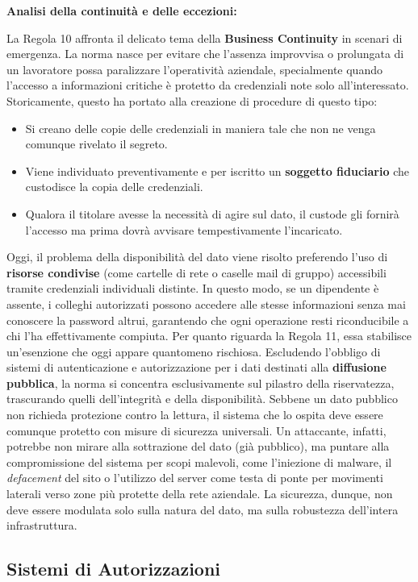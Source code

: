 \textbf{Analisi della continuità e delle eccezioni:}

La Regola 10 affronta il delicato tema della \textbf{Business Continuity} in scenari di emergenza.
La norma nasce per evitare che l'assenza improvvisa o prolungata di un lavoratore possa paralizzare l'operatività aziendale, specialmente quando l'accesso a informazioni critiche è protetto da credenziali note solo all'interessato.
Storicamente, questo ha portato alla creazione di procedure di questo tipo:
\begin{itemize}
    \item Si creano delle copie delle credenziali in maniera tale che non ne venga comunque rivelato il segreto.
    \item Viene individuato preventivamente e per iscritto un \textbf{soggetto fiduciario} che custodisce la copia delle credenziali.
    \item Qualora il titolare avesse la necessità di agire sul dato, il custode gli fornirà l'accesso ma prima dovrà avvisare tempestivamente l'incaricato.
\end{itemize}

Oggi, il problema della disponibilità del dato viene risolto preferendo l'uso di \textbf{risorse condivise} (come cartelle di rete o caselle mail di gruppo) accessibili tramite credenziali individuali distinte.
In questo modo, se un dipendente è assente, i colleghi autorizzati possono accedere alle stesse informazioni senza mai conoscere la password altrui, garantendo che ogni operazione resti riconducibile a chi l'ha effettivamente compiuta.
Per quanto riguarda la Regola 11, essa stabilisce un'esenzione che oggi appare quantomeno rischiosa.
Escludendo l'obbligo di sistemi di autenticazione e autorizzazione per i dati destinati alla \textbf{diffusione pubblica}, la norma si concentra esclusivamente sul pilastro della riservatezza, trascurando quelli dell'integrità e della disponibilità.
Sebbene un dato pubblico non richieda protezione contro la lettura, il sistema che lo ospita deve essere comunque protetto con misure di sicurezza universali.
Un attaccante, infatti, potrebbe non mirare alla sottrazione del dato (già pubblico), ma puntare alla compromissione del sistema per scopi malevoli, come l'iniezione di malware, il \textit{defacement} del sito o l'utilizzo del server come testa di ponte per movimenti laterali verso zone più protette della rete aziendale.
La sicurezza, dunque, non deve essere modulata solo sulla natura del dato, ma sulla robustezza dell'intera infrastruttura.
\subsection{Sistemi di Autorizzazioni}
